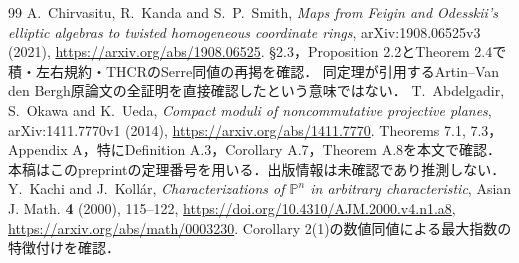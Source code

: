 \documentclass[11pt,a4paper]{ltjsarticle}
\begin{document}
\begingroup\small
\begin{thebibliography}{99}
 A.~Chirvasitu, R.~Kanda and S.~P.~Smith,
\emph{Maps from Feigin and Odesskii's elliptic algebras to twisted homogeneous coordinate rings},
arXiv:1908.06525v3 (2021), \url{https://arxiv.org/abs/1908.06525}.
\S2.3，Proposition 2.2とTheorem 2.4で積・左右規約・THCRのSerre同値の再掲を確認．
同定理が引用するArtin--Van den Bergh原論文の全証明を直接確認したという意味ではない．
 T.~Abdelgadir, S.~Okawa and K.~Ueda,
\emph{Compact moduli of noncommutative projective planes},
arXiv:1411.7770v1 (2014),
\url{https://arxiv.org/abs/1411.7770}.
Theorems 7.1, 7.3，Appendix A，特にDefinition A.3，Corollary A.7，Theorem A.8を本文で確認．
本稿はこのpreprintの定理番号を用いる．出版情報は未確認であり推測しない．
 Y.~Kachi and J.~Koll\'ar,
\emph{Characterizations of $\mathbb P^n$ in arbitrary characteristic},
Asian J. Math. \textbf{4} (2000), 115--122,
\url{https://doi.org/10.4310/AJM.2000.v4.n1.a8},
\url{https://arxiv.org/abs/math/0003230}.
Corollary 2(1)の数値同値による最大指数の特徴付けを確認．


\end{thebibliography}
\end{document}
